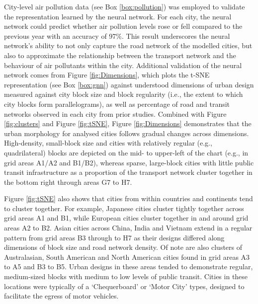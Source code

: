 \documentclass[preprint,10pt]{elsarticle} %
\begin{document}
City-level air pollution data (see Box \ref{box:pollution}) was employed to validate the representation learned by the neural network. For each city, the neural network could predict whether air pollution levels rose or fell compared to the previous year with an accuracy of 97\%. This result underscores the neural network's ability to not only capture the road network of the modelled cities, but also to approximate the relationship between the transport network and the behaviour of air pollutants within the city. Additional validation of the neural network comes from Figure \ref{fig:Dimensions}, which plots the t-SNE representation (see Box \ref{box:gnn}) against understood dimensions of urban design measured against city block size and block regularity (i.e., the extent to which city blocks form parallelograms), as well as percentage of road and transit networks observed in each city from prior studies\cite{Thompson2020,Nice2019b}. Combined with Figure \ref{fig:clusters} and Figure \ref{fig:tSNE}, Figure \ref{fig:Dimensions} demonstrates that the urban morphology for analysed cities follows gradual changes across dimensions. High-density, small-block size and cities with relatively regular (e.g., quadrilateral) blocks are depicted on the mid- to upper-left of the chart (e.g., in grid areas A1/A2 and B1/B2), whereas sparse, large-block cities with little public transit infrastructure as a proportion of the transport network cluster together in the bottom right through areas G7 to H7. 

Figure \ref{fig:tSNE} also shows that cities from within countries and continents tend to cluster together. For example, Japanese cities cluster tightly together across grid areas A1 and B1, while European cities cluster together in and around grid areas A2 to B2. Asian cities across China, India and Vietnam extend in a regular pattern from grid areas B3 through to H7 as their designs differed along dimensions of block size and road network density. Of note are also clusters of Australasian, South American and North American cities found in grid areas A3 to A5 and B3 to B5. Urban designs in these areas tended to demonstrate regular, medium-sized blocks with medium to low levels of public transit. Cities in these locations were typically of a `Chequerboard' or `Motor City' types, designed to facilitate the egress of motor vehicles.
\end{document}

